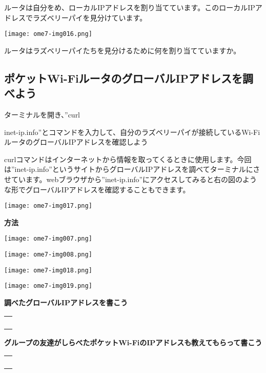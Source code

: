 ルータは自分をめ、ローカルIPアドレスを割り当てています。このローカルIPアドレスでラズベリーパイを見分けています。

\centering
\texttt{[image: ome7-img016.png]}
\flushleft

\theQuestion ルータはラズベリーパイたちを見分けるために何を割り当てていますか。\label{Q:globalIP}


\clearpage
\subsection*{\theExercise ポケットWi-FiルータのグローバルIPアドレスを調べよう\label{E:router}}
\begin{minipage}[b]{0.58\textwidth}
	ターミナルを開き、”curl

	inet-ip.info”とコマンドを入力して、自分のラズベリーパイが接続しているWi-FiルータのグローバルIPアドレスを確認しよう

	curlコマンドはインターネットから情報を取ってくるときに使用します。今回は”inet-ip.info”というサイトからグローバルIPアドレスを調べてターミナルにさせています。webブラウザから”inet-ip.info”にアクセスしてみると右の図のような形でグローバルIPアドレスを確認することもできます。

\end{minipage}
\texttt{[image: ome7-img017.png]}

{\bfseries 方法}

\centering
\texttt{[image: ome7-img007.png]}

\centering
\texttt{[image: ome7-img008.png]}
\flushleft

\centering
\texttt{[image: ome7-img018.png]}

\centering
\texttt{[image: ome7-img019.png]}
\flushleft

{\bfseries 調べたグローバルIPアドレスを書こう}

\centering
\begin{tabular}{|p{}|} \hline
	\\
	\\
	\\
	\\ \hline
\end{tabular}
\flushleft

{\bfseries グループの友達がしらべたポケットWi-FiのIPアドレスも教えてもらって書こう}

\centering
\begin{tabular}{|p{}|} \hline
	\\
	\\
	\\
	\\ \hline
\end{tabular}
\flushleft
